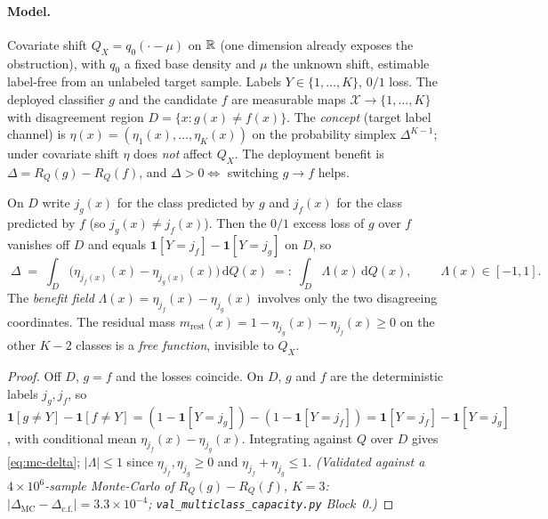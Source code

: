 \paragraph{Model.} Covariate shift $Q_X=q_0(\cdot-\mu)$ on $\mathbb R$ (one dimension already
exposes the obstruction), with $q_0$ a fixed base density and $\mu$ the unknown shift,
estimable label-free from an unlabeled target sample. Labels $Y\in\{1,\dots,K\}$, $0/1$
loss. The deployed classifier $g$ and the candidate $f$ are measurable maps
$\mathcal X\to\{1,\dots,K\}$ with disagreement region $D=\{x:g(x)\neq f(x)\}$. The
\emph{concept} (target label channel) is $\eta(x)=(\eta_1(x),\dots,\eta_K(x))$ on the
probability simplex $\Delta^{K-1}$; under covariate shift $\eta$ does \emph{not} affect
$Q_X$. The deployment benefit is $\Delta=R_Q(g)-R_Q(f)$, and $\Delta>0\iff$ switching
$g\to f$ helps.

\begin{lemma}\label{lem:mc-identity}
On $D$ write $j_g(x)$ for the class predicted by $g$ and $j_f(x)$ for the class predicted
by $f$ (so $j_g(x)\neq j_f(x)$). Then the $0/1$ excess loss of $g$ over $f$ vanishes off
$D$ and equals $\mathbf 1[Y{=}j_f]-\mathbf 1[Y{=}j_g]$ on $D$, so
\begin{equation}\label{eq:mc-delta}
  \boxed{\;\Delta \;=\; \int_D \big(\eta_{j_f(x)}(x)-\eta_{j_g(x)}(x)\big)\,\mathrm dQ(x)
  \;=:\;\int_D \Lambda(x)\,\mathrm dQ(x),\;}
  \qquad \Lambda(x)\in[-1,1].
\end{equation}
The \emph{benefit field} $\Lambda(x)=\eta_{j_f}(x)-\eta_{j_g}(x)$ involves only the two
disagreeing coordinates. The residual mass
$m_{\mathrm{rest}}(x)=1-\eta_{j_g}(x)-\eta_{j_f}(x)\ge0$ on the other $K-2$ classes is a
\emph{free function}, invisible to $Q_X$.
\end{lemma}
\begin{proof}
Off $D$, $g=f$ and the losses coincide. On $D$, $g$ and $f$ are the deterministic labels
$j_g,j_f$, so $\mathbf 1[g\neq Y]-\mathbf 1[f\neq Y]=(1-\mathbf 1[Y{=}j_g])-(1-\mathbf
1[Y{=}j_f])=\mathbf 1[Y{=}j_f]-\mathbf 1[Y{=}j_g]$, with conditional mean
$\eta_{j_f}(x)-\eta_{j_g}(x)$. Integrating against $Q$ over $D$ gives \eqref{eq:mc-delta};
$|\Lambda|\le1$ since $\eta_{j_f},\eta_{j_g}\ge0$ and $\eta_{j_f}+\eta_{j_g}\le1$.
\emph{(Validated against a $4\times10^6$-sample Monte-Carlo of $R_Q(g)-R_Q(f)$, $K=3$:
$|\Delta_{\mathrm{MC}}-\Delta_{\mathrm{c.f.}}|=3.3\times10^{-4}$;
\texttt{val\_multiclass\_capacity.py} Block~0.)}
\end{proof}

